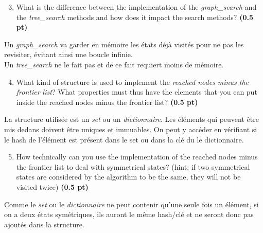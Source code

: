 \documentclass[11pt,a4paper]{../template/report}
\begin{document}
\begin{enumerate}
\setcounter{enumi}{2}
    \item What is the difference between the implementation of the \textit{graph\_search} and the \textit{tree\_search} methods and how does it impact the search methods? \textbf{(0.5 pt)}
\end{enumerate}

\begin{answer}
Un \textit{graph\_search} va garder en mémoire les états déjà visités pour ne pas les revisiter, évitant ainsi une boucle infinie. \\
Un \textit{tree\_search} ne le fait pas et de ce fait requiert moins de mémoire.
\end{answer}



\begin{enumerate}
\setcounter{enumi}{3}
    \item What kind of structure is used to implement the \textit{reached nodes minus the frontier list}? What properties must thus have the elements that you can
	put inside the reached nodes minus the frontier list? \textbf{(0.5 pt)}
\end{enumerate}

\begin{answer}
La structure utilisée est un \textit{set} ou un \textit{dictionnaire}. Les éléments qui peuvent être mis dedans doivent être uniques et immuables. On peut y accéder en vérifiant si le hash de l'élément est présent dans le set ou dans la clé du le dictionnaire.
\end{answer}



\begin{enumerate}
\setcounter{enumi}{4}
    \item How technically can you use the implementation of the reached nodes minus the frontier list to deal with symmetrical states? (hint: if two symmetrical states are considered by the algorithm to be the same, they will not be visited twice) \textbf{(0.5 pt)}
\end{enumerate}

\begin{answer}
Comme le \textit{set} ou le \textit{dictionnaire} ne peut contenir qu'une seule fois un élément, si on a deux états symétriques, ils auront le même hash/clé et ne seront donc pas ajoutés dans la structure.
\end{answer}
\end{document}
